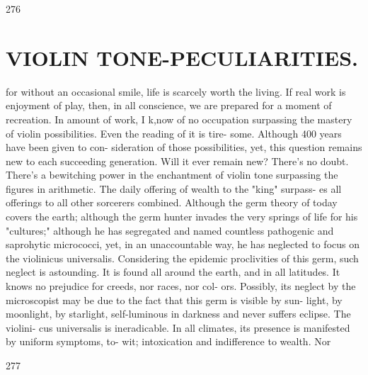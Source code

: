 \documentclass{article}
\begin{document}
276

\section*{VIOLIN TONE-PECULIARITIES.}
for without an occasional smile, life is scarcely worth the living. If real work is enjoyment of play, then, in all conscience, we are prepared for a moment of recreation. In amount of work, I k,now of no occupation surpassing the mastery of violin possibilities. Even the reading of it is tire- some. Although 400 years have been given to con- sideration of those possibilities, yet, this question remains new to each succeeding generation. Will it ever remain new? There's no doubt. There's a bewitching power in the enchantment of violin tone surpassing the figures in arithmetic. The daily offering of wealth to the "king" surpass- es all offerings to all other sorcerers combined. Although the germ theory of today covers the earth; although the germ hunter invades the very springs of life for his "cultures;" although he has segregated and named countless pathogenic and saprohytic micrococci, yet, in an unaccountable way, he has neglected to focus on the violinicus universalis. Considering the epidemic proclivities of this germ, such neglect is astounding. It is found all around the earth, and in all latitudes. It knows no prejudice for creeds, nor races, nor col- ors. Possibly, its neglect by the microscopist may be due to the fact that this germ is visible by sun- light, by moonlight, by starlight, self-luminous in darkness and never suffers eclipse. The violini- cus universalis is ineradicable. In all climates, its presence is manifested by uniform symptoms, to- wit; intoxication and indifference to wealth. Nor

277
\end{document}

